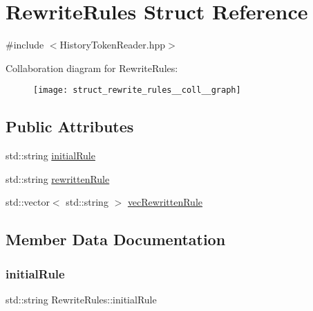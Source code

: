 \hypertarget{struct_rewrite_rules}{}\section{Rewrite\+Rules Struct Reference}
\label{struct_rewrite_rules}


{\ttfamily \#include $<$History\+Token\+Reader.\+hpp$>$}



Collaboration diagram for Rewrite\+Rules\+:
\nopagebreak
\begin{figure}[H]
\begin{center}
\leavevmode
\texttt{[image: struct\_rewrite\_rules\_\_coll\_\_graph]}
\end{center}
\end{figure}
\subsection*{Public Attributes}
\begin{DoxyCompactItemize}
\item 
std\+::string \mbox{\hyperlink{struct_rewrite_rules_a8ab1d58bcaf0a7997954d7930da0c622}{initial\+Rule}}
\item 
std\+::string \mbox{\hyperlink{struct_rewrite_rules_a8b43af4c21fe8159a6f2ff51292830fe}{rewritten\+Rule}}
\item 
std\+::vector$<$ std\+::string $>$ \mbox{\hyperlink{struct_rewrite_rules_ae4d826d219e89b6d6d09aee82c45294d}{vec\+Rewritten\+Rule}}
\end{DoxyCompactItemize}


\subsection{Member Data Documentation}
\mbox{\label{struct_rewrite_rules_a8ab1d58bcaf0a7997954d7930da0c622}} 
\subsubsection{\texorpdfstring{initial\+Rule}{initialRule}}
{\footnotesize\ttfamily std\+::string Rewrite\+Rules\+::initial\+Rule}

\mbox{\label{struct_rewrite_rules_a8b43af4c21fe8159a6f2ff51292830fe}} 
